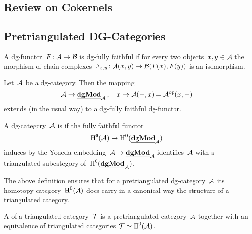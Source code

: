 \documentclass[a4paper,10pt]{scrartcl}
\begin{document}
\subsection{Review on Cokernels}


\subsection{Pretriangulated DG-Categories}

\begin{definition}
  A dg-functor~$F \colon \mathcal{A} \to \mathcal{B}$ is dg-fully faithful if for every two objects~$x, y \in \mathcal{A}$ the morphism of chain complexes~$F_{x,y} \colon \mathcal{A}(x,y) \to \mathcal{B}(F(x), F(y))$ is an isomorphism.
\end{definition}

\begin{proposition}
  Let~$\mathcal{A}$ be a dg-category.
  Then the mapping
  \[
    \mathcal{A}
    \to
    \underline{\mathbf{dgMod}}_{\mathcal{A}} \,,
    \quad
    x
    \mapsto
    \mathcal{A}(-,x)
    =
    \mathcal{A}^{{\mathrm{op}}}(x,-)
  \]
  extends (in the usual way) to a dg-fully faithful dg-functor.
\end{proposition}

\begin{definition}
  A dg-category~$\mathcal{A}$ is  if the fully faithful {\klinear} functor
  \[
    \operatorname{H}^0(\mathcal{A})
    \to
    \operatorname{H}^0(\underline{\mathbf{dgMod}}_{\mathcal{A}})
  \]
  induces by the Yoneda embedding~$\mathcal{A} \to \underline{\mathbf{dgMod}}_{\mathcal{A}}$ identifies~$\mathcal{A}$ with a triangulated subcategory of~$\operatorname{H}^0(\underline{\mathbf{dgMod}}_{\mathcal{A}})$.
\end{definition}

The above definition ensures that for a pretriangulated dg-category~$\mathcal{A}$ its homotopy category~$\operatorname{H}^0(\mathcal{A})$ does carry in a canonical way the structure of a triangulated category.

\begin{definition}
  A  of a triangulated category~$\mathcal{T}$ is a pretriangulated category~$\mathcal{A}$ together with an equivalence of triangulated categories~$\mathcal{T} \simeq \operatorname{H}^0(\mathcal{A})$.
\end{definition}
\end{document}
